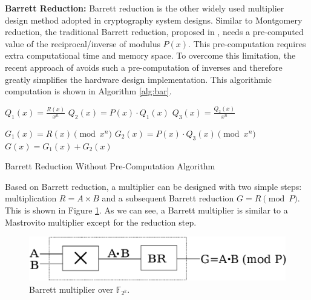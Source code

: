 	


{\bf Barrett Reduction:} Barrett reduction is the other widely used multiplier design method adopted in cryptography system designs.
Similar to Montgomery reduction, the traditional Barrett reduction, proposed in \cite{Barrett:1987}, needs a pre-computed value of the reciprocal/inverse of modulus $P(x)$.  
This pre-computation requires extra computational time and memory space. To overcome this limitation, the recent approach of \cite{Knezevic:2008} avoids such a pre-computation of 
inverses and therefore greatly simplifies the hardware design implementation. This algorithmic computation is shown in Algorithm \ref{alg:bar}.

\begin{algorithm}
\SetAlgoNoLine

	$Q_1(x)=\frac{R(x)}{x^n}$ 
	$Q_2(x)=P(x) \cdot Q_1(x)$ \;
	$Q_3(x)=\frac{Q_2(x)}{x^n}$ \;
	
	$G_1(x)=R(x) \pmod {x^n}$ 
	$G_2(x)=P(x)\cdot Q_3(x) \pmod {x^n}$ \;
	$G(x)=G_1(x) +G_2(x)$ \;
	
\caption{Barrett Reduction Without Pre-Computation Algorithm \cite{Knezevic:2008}}\label{alg:bar}
\end{algorithm}

Based on Barrett reduction, a multiplier can be designed with two simple steps:  multiplication $R=A \times B$ and a subsequent Barrett reduction $G=R \pmod {P}$.
This is shown in Figure \ref{fig:bar}. As we can see, a Barrett multiplier is similar to a Mastrovito multiplier except for the reduction step.

\begin{figure}[hbt]
	\begin{center}
	\includegraphics[scale=0.50]{figures/barrett.eps}
	\end{center}
	\caption{Barrett multiplier over $\mathbb{F}_{2^k}$.}
	\label{fig:bar}
\end{figure}

